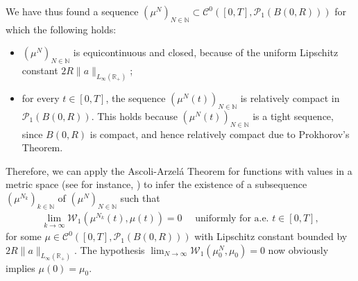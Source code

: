 \documentclass[A4paper,11pt]{article}
\theoremstyle{definition}
\newcommand{\N}{\mathbb{N}}
\newcommand{\R}{\mathbb{R}}
\newcommand{\W}{\mathcal{W}}
\begin{document}
We have thus found a sequence $(\mu^N)_{N \in \N} \subset \mathcal{C}^0([0,T],\mathcal{P}_1(B(0,R)))$ for which the following holds:
\begin{itemize}
\item $(\mu^N)_{N \in \N}$ is equicontinuous and closed, because of the uniform Lipschitz constant $2R\|a\|_{L_{\infty}(\R_+)}$;
\item for every $t \in [0,T]$, the sequence $(\mu^N(t))_{N \in \N}$ is relatively compact in $\mathcal{P}_1(B(0,R))$. This holds because $(\mu^N(t))_{N \in \N}$ is a tight sequence, since $B(0,R)$ is compact, and hence relatively compact due to Prokhorov's Theorem.
\end{itemize}
Therefore, we can apply the Ascoli-Arzel\'{a} Theorem for functions with values in a metric space (see for instance, \cite[Chapter 7, Theorem 18]{KelleyTop}) to infer the existence of a subsequence $(\mu^{N_k})_{k \in \N}$ of $(\mu^N)_{N \in \N}$ such that
\begin{align}\label{eq:unifconv}
\lim_{k \rightarrow \infty}\W_1(\mu^{N_k}(t),\mu(t)) = 0 \quad \text{ uniformly for a.e. } t \in [0,T],
\end{align}
for some $\mu \in \mathcal{C}^0([0,T],\mathcal{P}_1(B(0,R)))$ with Lipschitz constant bounded by $2R\|a\|_{L_{\infty}(\R_+)}$. The hypothesis $\lim_{N\rightarrow\infty}\W_1(\mu^N_0,\mu_0) = 0$ now obviously implies $\mu(0) = \mu_0$.
\end{document}
